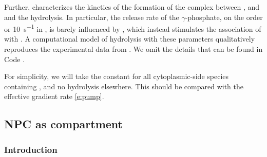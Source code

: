 \documentclass[12pt,notitlepage]{article}
\def\[#1\]{\begin{align}#1\end{align}}
\begin{document}
%


%

Further,
\cite[\href{https://i.ibb.co/jz37PW1/image.png}{Fig.~13}]{SeewaldETAL2003}
characterizes
the kinetics of the formation of the complex
between
,  and 
and the hydrolysis.
%
%
In particular, 
the release rate of the $\gamma$-phosphate,
on the order or \SI{10}{s^{-1}} in 
\cite[\href{https://i.ibb.co/jz37PW1/image.png}{Fig.~13}]{SeewaldETAL2003},
is barely influenced by ,
which instead stimulates
the association of  with .
%
%
%
A computational model of hydrolysis
with these parameters qualitatively reproduces
the experimental data from
\cite[\href{https://i.ibb.co/6ghqPB7/image.jpg}{Fig.~4A}]{LounsburyMacara1997}.
%
%
We omit the details
that can be found in Code \protect{}.

%

For simplicity,
we will take the constant
\[
	\label{e:hydrolysis}
\]
for all cytoplasmic-side species containing ,
and
no  hydrolysis elsewhere.
%
%
This should be compared with 
the effective  gradient rate \eqref{e:pump}.










\subsection{NPC as compartment} \label{ss:3s}

\subsubsection*{Introduction}
\end{document}

